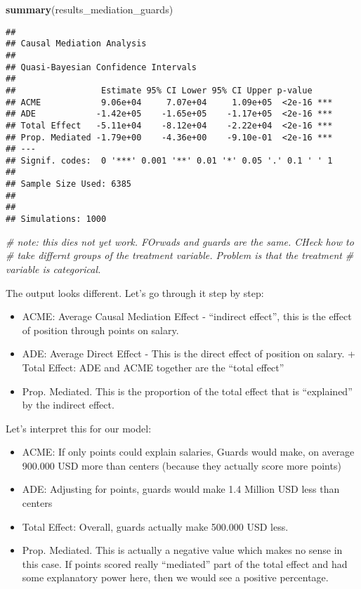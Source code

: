 \documentclass[
]{book}
\newenvironment{Shaded}{\begin{snugshade}}{\end{snugshade}}
\newcommand{\CommentTok}[1]{\textcolor[rgb]{0.56,0.35,0.01}{\textit{#1}}}
\newcommand{\FunctionTok}[1]{\textcolor[rgb]{0.13,0.29,0.53}{\textbf{#1}}}
\newcommand{\NormalTok}[1]{#1}
\providecommand{\tightlist}{%
  \setlength{\itemsep}{0pt}\setlength{\parskip}{0pt}}
\begin{document}
\begin{Shaded}
\begin{Highlighting}[]
\FunctionTok{summary}\NormalTok{(results\_mediation\_guards)}
\end{Highlighting}
\end{Shaded}

\begin{verbatim}
## 
## Causal Mediation Analysis 
## 
## Quasi-Bayesian Confidence Intervals
## 
##                 Estimate 95% CI Lower 95% CI Upper p-value    
## ACME            9.06e+04     7.07e+04     1.09e+05  <2e-16 ***
## ADE            -1.42e+05    -1.65e+05    -1.17e+05  <2e-16 ***
## Total Effect   -5.11e+04    -8.12e+04    -2.22e+04  <2e-16 ***
## Prop. Mediated -1.79e+00    -4.36e+00    -9.10e-01  <2e-16 ***
## ---
## Signif. codes:  0 '***' 0.001 '**' 0.01 '*' 0.05 '.' 0.1 ' ' 1
## 
## Sample Size Used: 6385 
## 
## 
## Simulations: 1000
\end{verbatim}

\begin{Shaded}
\begin{Highlighting}[]
\CommentTok{\# note: this dies not yet work. FOrwads and guards are the same. CHeck how to }
\CommentTok{\# take differnt groups of the treatment variable. Problem is that the treatment}
\CommentTok{\# variable is categorical.}
\end{Highlighting}
\end{Shaded}

The output looks different. Let's go through it step by step:

\begin{itemize}
\tightlist
\item
  ACME: Average Causal Mediation Effect - ``indirect effect'', this is the effect of position through points on salary.\\
\item
  ADE: Average Direct Effect - This is the direct effect of position on salary. + Total Effect: ADE and ACME together are the ``total effect''\\
\item
  Prop. Mediated. This is the proportion of the total effect that is ``explained'' by the indirect effect.
\end{itemize}

Let's interpret this for our model:

\begin{itemize}
\tightlist
\item
  ACME: If only points could explain salaries, Guards would make, on average 900.000 USD more than centers (because they actually score more points)
\item
  ADE: Adjusting for points, guards would make 1.4 Million USD less than centers
\item
  Total Effect: Overall, guards actually make 500.000 USD less.
\item
  Prop. Mediated. This is actually a negative value which makes no sense in this case. If points scored really ``mediated'' part of the total effect and had some explanatory power here, then we would see a positive percentage.
\end{itemize}
\end{document}
